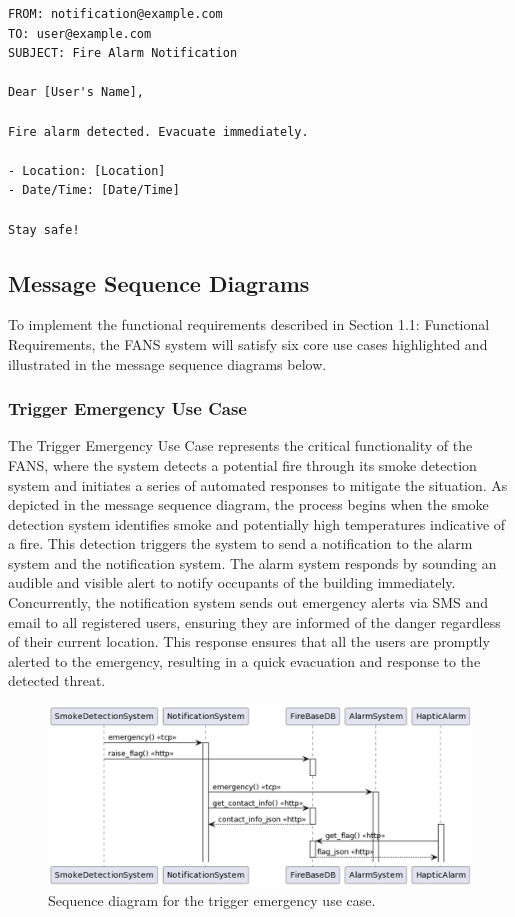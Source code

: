 \begin{lstlisting}[label={lst:email},caption={Email notification for detected emergency in FANS.}]
FROM: notification@example.com
TO: user@example.com
SUBJECT: Fire Alarm Notification

Dear [User's Name],

Fire alarm detected. Evacuate immediately.

- Location: [Location]
- Date/Time: [Date/Time]

Stay safe!
\end{lstlisting}

\subsection{Message Sequence Diagrams}

To implement the functional requirements described in Section 1.1: Functional Requirements, the FANS system will
satisfy six core use cases highlighted and illustrated in the message sequence diagrams below.

\subsubsection{Trigger Emergency Use Case}

The Trigger Emergency Use Case represents the critical functionality of the FANS, where the system detects a potential
fire through its smoke detection system and initiates a series of automated responses to mitigate the situation. As
depicted in the message sequence diagram, the process begins when the smoke detection system identifies smoke and
potentially high temperatures indicative of a fire. This detection triggers the system to send a notification to the
alarm system and the notification system. The alarm system responds by sounding an audible and visible alert to notify
occupants of the building immediately. Concurrently, the notification system sends out emergency alerts via SMS and
email to all registered users, ensuring they are informed of the danger regardless of their current location. This
response ensures that all the users are promptly alerted to the emergency, resulting in a quick evacuation and response
to the detected threat.

\begin{figure}[H]
    \centering
    \includegraphics[width=\linewidth]{../assets/sequence/TriggerEmergencyUseCaseSequenceDiagram.png}
    \caption{Sequence diagram for the trigger emergency use case.}
\end{figure}

